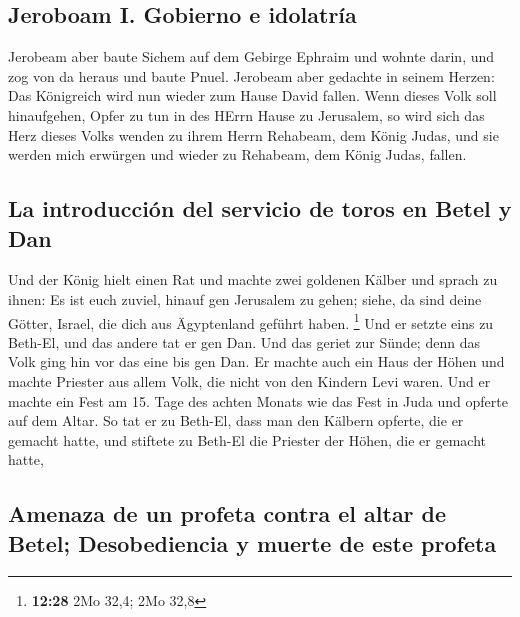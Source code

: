 \hypertarget{jeroboam-i.-gobierno-e-idolatruxeda}{%
\subsection{Jeroboam I. Gobierno e
idolatría}\label{jeroboam-i.-gobierno-e-idolatruxeda}}

 Jerobeam aber baute Sichem auf dem Gebirge Ephraim und
wohnte darin, und zog von da heraus und baute Pnuel. 
Jerobeam aber gedachte in seinem Herzen: Das Königreich wird nun wieder
zum Hause David fallen.  Wenn dieses Volk soll
hinaufgehen, Opfer zu tun in des HErrn Hause zu Jerusalem, so wird sich
das Herz dieses Volks wenden zu ihrem Herrn Rehabeam, dem König Judas,
und sie werden mich erwürgen und wieder zu Rehabeam, dem König Judas,
fallen.

\hypertarget{la-introducciuxf3n-del-servicio-de-toros-en-betel-y-dan}{%
\subsection{La introducción del servicio de toros en Betel y
Dan}\label{la-introducciuxf3n-del-servicio-de-toros-en-betel-y-dan}}

 Und der König hielt einen Rat und machte zwei goldenen
Kälber und sprach zu ihnen: Es ist euch zuviel, hinauf gen Jerusalem zu
gehen; siehe, da sind deine Götter, Israel, die dich aus Ägyptenland
geführt haben. \footnote{\textbf{12:28} 2Mo 32,4; 2Mo 32,8}
 Und er setzte eins zu Beth-El, und das andere tat er gen
Dan.  Und das geriet zur Sünde; denn das Volk ging hin
vor das eine bis gen Dan.  Er machte auch ein Haus der
Höhen und machte Priester aus allem Volk, die nicht von den Kindern Levi
waren.  Und er machte ein Fest am 15. Tage des achten
Monats wie das Fest in Juda und opferte auf dem Altar. So tat er zu
Beth-El, dass man den Kälbern opferte, die er gemacht hatte, und
stiftete zu Beth-El die Priester der Höhen, die er gemacht hatte,

\hypertarget{amenaza-de-un-profeta-contra-el-altar-de-betel-desobediencia-y-muerte-de-este-profeta}{%
\subsection{Amenaza de un profeta contra el altar de Betel;
Desobediencia y muerte de este
profeta}\label{amenaza-de-un-profeta-contra-el-altar-de-betel-desobediencia-y-muerte-de-este-profeta}}


